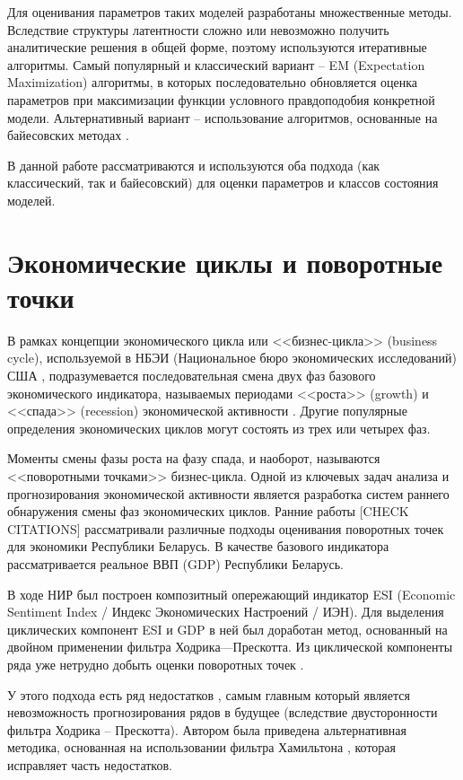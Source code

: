 \documentclass[a4paper,14pt]{extreport}
\begin{document}
Для оценивания параметров таких моделей разработаны множественные методы. Вследствие структуры латентности сложно или невозможно получить аналитические решения в общей форме, поэтому используются итеративные алгоритмы. Самый популярный и классический вариант \cite{malNovopMSVARX, malNovopHiddenMarkov, rs_hamilton_palgrave} -- EM (Expectation Maximization) алгоритмы, в которых последовательно обновляется оценка параметров при максимизации функции условного правдоподобия конкретной модели. Альтернативный вариант -- использование алгоритмов, основанные на байесовских методах \cite{rs_persio2014, rs_hamilton_palgrave}. 

В данной работе рассматриваются и используются оба подхода (как классический, так и байесовский) для оценки параметров и классов состояния моделей.


\section{Экономические циклы и поворотные точки}

В рамках концепции экономического цикла или <<бизнес-цикла>> (business cycle), используемой в НБЭИ (Национальное бюро экономических исследований) США \cite{nberDevelopment}, подразумевается последовательная смена двух фаз базового экономического индикатора, называемых периодами <<роста>> (growth) и <<спада>> (recession) экономической активности \cite{oecdCycleExtraction}. Другие популярные определения экономических циклов могут состоять из трех или четырех фаз.

Моменты смены фазы роста на фазу спада, и наоборот, называются <<поворотными точками>> бизнес-цикла. Одной из ключевых задач анализа и прогнозирования экономической активности является разработка систем раннего обнаружения смены фаз экономических циклов.  Ранние работы \cite{esiMaking,esiExtra,mak_mal_bv_2018} [CHECK CITATIONS] рассматривали различные подходы оценивания поворотных точек для экономики Республики Беларусь. В качестве базового индикатора рассматривается реальное ВВП (GDP) Республики Беларусь.

В ходе НИР \cite{esiMaking} был построен композитный опережающий индикатор ESI (Economic Sentiment Index / Индекс Экономических Настроений / ИЭН). Для выделения циклических компонент ESI и GDP в ней был доработан метод, основанный на двойном применении фильтра Ходрика—Прескотта. Из циклической компоненты ряда уже нетрудно добыть оценки поворотных точек \cite{esiMaking,esiExtra}. 

У этого подхода есть ряд недостатков \cite{ham_never_hp}, самым главным который является невозможность прогнозирования рядов в будущее (вследствие двусторонности фильтра Ходрика -- Прескотта). Автором была приведена альтернативная методика, основанная на использовании фильтра Хамильтона \cite{mak_mal_bv_2018}, которая исправляет часть недостатков.
\end{document}
